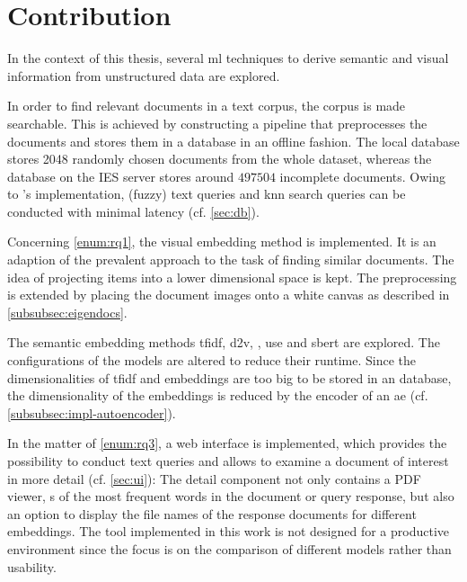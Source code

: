 \newpage
\section{Contribution}\label{sec:contribution}

In the context of this thesis, several \ac{ml} techniques to derive semantic and visual information 
from unstructured data are explored.

In order to find relevant documents in a text corpus, the corpus is made searchable.
This is achieved by constructing a pipeline that preprocesses the documents 
and stores them in a database in an offline fashion.
The local \databaseName{} database stores 2048 randomly chosen documents from the whole dataset, 
whereas the database on the IES server stores around $497504$ incomplete documents.
Owing to \databaseName{}'s implementation, (fuzzy) text queries and \ac{knn} search queries 
can be conducted with minimal latency (cf. \autoref{sec:db}).

Concerning \ref{enum:rq1}, the visual embedding method \eigendocs{} is implemented.
It is an adaption of the prevalent \eigenfaces{} approach to the task of finding similar documents.
The idea of projecting items into a lower dimensional space is kept.
The preprocessing is extended by placing the document images onto a white canvas 
as described in \autoref{subsubsec:eigendocs}.

The semantic embedding methods \ac{tfidf}, \ac{d2v}, \infersent{}, \ac{use} and \ac{sbert} are explored.
The configurations of the models are altered to reduce their runtime.
Since the dimensionalities of \ac{tfidf} and \infersent{} embeddings are too big 
to be stored in an \databaseName{} database, 
the dimensionality of the embeddings is reduced by the encoder of an \ac{ae} 
(cf. \autoref{subsubsec:impl-autoencoder}).
 
In the matter of \ref{enum:rq3}, a web interface is implemented, 
which provides the possibility to conduct text queries and
allows to examine a document of interest in more detail (cf. \autoref{sec:ui}):
The detail component not only contains a PDF viewer, 
\wordcloud{}s of the most frequent words in the document or query response, 
but also an option to display the file names of the response documents for different embeddings.
The tool implemented in this work is not designed for a productive environment since 
the focus is on the comparison of different models rather than usability.

